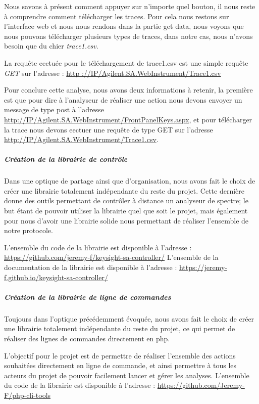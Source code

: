         Nous savons à présent comment appuyer sur n'importe quel bouton, il nous reste à comprendre comment télécharger les traces.
        Pour cela nous restons sur l'interface web et nous nous rendons dans la partie  get data, nous
            voyons que nous pouvons télécharger plusieurs types de traces, dans notre cas, nous n'avons besoin que du chier
            \textit{trace1.csv}.

        La requête eectuée pour le téléchargement de  trace1.csv  est une simple requête \textit{GET} sur l'adresse :
            \url{http ://IP/Agilent.SA.WebInstrument/Trace1.csv}

        Pour conclure cette analyse, nous avons deux informations à retenir, la première est que pour dire à l'analyseur de
            réaliser une action nous devons envoyer un message de type post à l'adresse
            \url{http://IP/Agilent.SA.WebInstrument/FrontPanelKeys.aspx},
            et pour télécharger la trace nous devons eectuer une requête de type GET sur l'adresse
            \url{http://IP/Agilent.SA.WebInstrument/Trace1.csv}.

    \subparagraph{Création de la librairie de contrôle}
        Dans une optique de partage ainsi que d'organisation, nous avons fait le
            choix de créer une librairie totalement indépendante du reste du projet.
        Cette dernière donne des outils permettant de contrôler à distance un analyseur de spectre;
            le but étant de pouvoir utiliser la librairie quel que soit le projet,
            mais également pour nous d'avoir une librairie solide nous permettant de réaliser l'ensemble de notre protocole.

        L'ensemble du code de la librairie est disponible à l'adresse :
            \url{https://github.com/jeremy-f/keysight-sa-controller/}
        L'ensemble de la documentation de la librairie est disponible à l'adresse :
            \url{https://jeremy-f.github.io/keysight-sa-controller/}

    \subparagraph{Création de la librairie de ligne de commandes}
        Toujours dans l'optique précédemment évoquée, nous avons fait le choix de créer
            une librairie totalement indépendante du reste du projet,
            ce qui permet de réaliser des lignes de commandes directement en php.

        L'objectif pour le projet est de permettre de réaliser l'ensemble des actions souhaitées directement en ligne de
        commande, et ainsi permettre à tous les acteurs du projet de pouvoir facilement lancer et gérer les analyses.
        L'ensemble du code de la librairie est disponible à l'adresse : \url{https://github.com/Jeremy-F/php-cli-tools}


